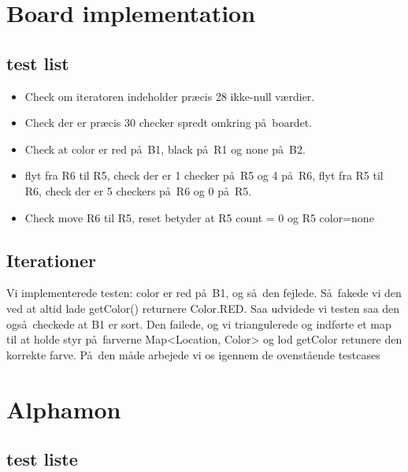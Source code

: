 \documentclass[a4paper]{article}
\begin{document}
\lhead{}
\rhead{}


\section{Board implementation}
\subsection{test list}
\begin{itemize}
\item Check om iteratoren indeholder pr\ae cis 28 ikke-null v\ae rdier.
\item Check der er pr\ae cis 30 checker spredt omkring p\aa\ boardet.
\item Check at color er red p\aa\ B1, black p\aa\ R1 og none p\aa\ B2.
\item flyt fra R6 til R5, check der er 1 checker p\aa\ R5 og 4 p\aa\ R6,
flyt fra R5 til R6, check der er 5 checkers p\aa\ R6 og 0 p\aa\ R5.

\item Check move R6 til R5, reset betyder at R5 count = 0 og R5 color=none
\end{itemize}

\subsection{Iterationer}

Vi implementerede testen: color er red p\aa\ B1, og s\aa\ den fejlede.
S\aa\ fakede vi den ved at altid lade getColor() returnere Color.RED.
Saa udvidede vi testen saa den ogs\aa\ checkede at B1 er sort.
Den failede, og vi triangulerede og indførte et map til at holde styr
p\aa\ farverne Map<Location, Color> og lod getColor retunere den korrekte
farve.
P\aa\ den m\aa de arbejede vi os igennem de ovenst\aa ende testcases



\section{Alphamon}

\subsection{test liste}
\end{document}
